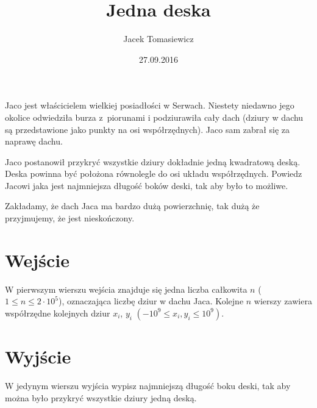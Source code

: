 \documentclass[zad,zawodnik,utf8]{sinol}
\title{Jedna deska}
\author{Jacek Tomasiewicz} %
\date{27.09.2016}
\begin{document}
\begin{tasktext}%
Jaco jest właścicielem wielkiej posiadłości w Serwach.
Niestety niedawno jego okolice odwiedziła burza z~piorunami i podziurawiła cały dach (dziury w dachu są przedstawione jako punkty na osi współrzędnych).
Jaco sam zabrał się za naprawę dachu.

Jaco postanowił przykryć wszystkie dziury dokładnie jedną kwadratową deską.
Deska powinna być położona równolegle do osi układu współrzędnych.
Powiedz Jacowi jaka jest najmniejsza długość boków deski, tak aby było to możliwe.

Zakładamy, że dach Jaca ma bardzo dużą powierzchnię, tak dużą że przyjmujemy, że jest nieskończony. 
  \section{Wejście}
W pierwszym wierszu wejścia znajduje się jedna liczba całkowita $n$ ($1 \leq n \leq 2 \cdot 10^5$),
oznaczająca liczbę dziur w dachu Jaca. Kolejne $n$ wierszy zawiera współrzędne kolejnych dziur $x_i$, $y_i$
$(-10^9 \leq x_i, y_i \leq 10^9)$.
  \section{Wyjście}
W jedynym wierszu wyjścia wypisz najmniejszą długość boku deski, tak aby można było przykryć wszystkie dziury jedną deską.

\makecompactexample
\end{tasktext}
\end{document}
